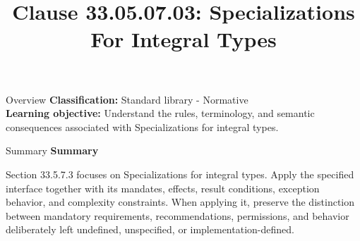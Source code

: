 \documentclass[10pt,letterpaper]{article}
\title{Clause 33.05.07.03: Specializations For Integral Types}
\author{}
\date{}
\begin{document}
\maketitle
\begin{CornellOverviewBox}{Overview}
\textbf{Classification:} Standard library - Normative\\[2pt]
\textbf{Learning objective:} Understand the rules, terminology, and semantic consequences associated with Specializations for integral types.
\end{CornellOverviewBox}\begin{CornellSummaryBox}{Summary}
{\sffamily\bfseries\color{Accent} Summary}\par\vspace{3pt}Section 33.5.7.3 focuses on Specializations for integral types. Apply the specified interface together with its mandates, effects, result conditions, exception behavior, and complexity constraints. When applying it, preserve the distinction between mandatory requirements, recommendations, permissions, and behavior deliberately left undefined, unspecified, or implementation-defined.
\end{CornellSummaryBox}
\end{document}
